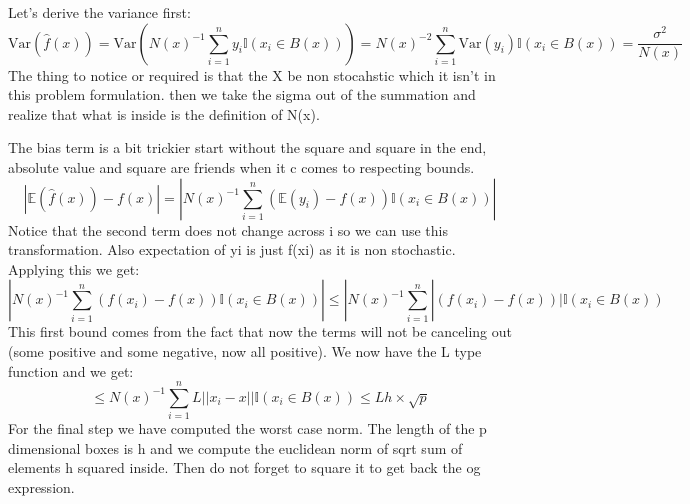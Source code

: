 \documentclass{article}
\begin{document}
Let's derive the variance first:
$$\text{Var}(\hat{f}(x)) = \text{Var}(N(x)^{-1}\sum_{i=1}^{n}y_i\mathbb{I}(x_i \in B(x)))
= N(x)^{-2}\sum_{i=1}^{n}\text{Var}(y_i)\mathbb{I}(x_i \in B(x)) = \frac{\sigma^2}{N(x)}
$$
The thing to notice or required is that the X be non stocahstic which it isn't in this problem formulation. 
then we take the sigma out of the summation and realize that what is inside is the definition of N(x). 

The bias term is a bit trickier start without the square and square in the end, absolute value and square are friends when it c
comes to respecting bounds.
$$|\mathbb{E}(\hat{f}(x)) -f(x)| = |N(x)^{-1}\sum_{i=1}^{n}(\mathbb{E}(y_i) -f(x))\mathbb{I}(x_i \in B(x)) |$$
Notice that the second term does not change across i so we can use this transformation. Also expectation of yi is just f(xi) as it is non stochastic.
Applying this we get:
$$|N(x)^{-1}\sum_{i=1}^{n}(f(x_i) -f(x))\mathbb{I}(x_i \in B(x)) | \leq |N(x)^{-1}\sum_{i=1}^{n}|(f(x_i) -f(x))|\mathbb{I}(x_i \in B(x)) $$
This first bound comes from the fact that now the terms will not be canceling out (some positive and some negative, now all positive). 
We now have the L type function and we get: 
$$\leq N(x)^{-1}\sum_{i=1}^{n}L||x_i - x||\mathbb{I}(x_i \in B(x))  \leq L h \times \sqrt{p}$$
For the final step we have computed the worst case norm. The length of the p dimensional boxes is h and we compute the euclidean norm of sqrt sum of elements h squared inside.
Then do not forget to square it to get back the og expression.
\end{document}
